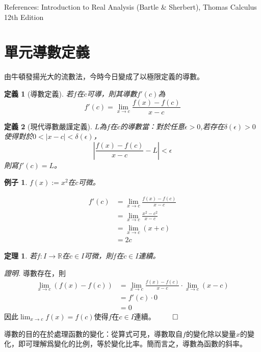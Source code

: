 \documentclass[12pt]{article}
\newtheorem{definition}{定義}
\newtheorem*{theorem}{定理}
\newtheorem*{example}{例子}
\renewenvironment*{proof}{\textit{證明.}}{\hfill$\qed$}
\begin{document}
    References: Introduction to Real Analysis (Bartle \& Sherbert), Thomas Calculus 12th Edition
    \section*{單元導數定義}

    由牛頓發揚光大的流數法，今時今日變成了以極限定義的導數。

    \begin{definition}[導數定義]
        若$f$在$c$可導，則其導數$f'(c)$為$$f'(c)=\lim_{x\to c}\frac{f(x)-f(c)}{x-c}$$
    \end{definition}

    \begin{definition}[現代導數嚴謹定義]
        $L$為$f$在$c$的導數當：對於任意$\epsilon>0$,若存在$\delta(\epsilon)>0$使得對於$0<|x-c|<\delta(\epsilon)$，$$|\frac{f(x)-f(c)}{x-c}-L|<\epsilon$$
        則寫$f'(c)=L$。
    \end{definition}

    \begin{example}
        $f(x):=x^2$在$c$可微。

        \begin{align*}
            f'(c)&=\lim_{x\to c}\frac{f(x)-f(c)}{x-c}\\
            &=\lim_{x\to c}\frac{x^2-c^2}{x-c}\\
            &=\lim_{x\to c}(x+c)\\
            &=2c
        \end{align*}
    \end{example}

    \begin{theorem}
        若$f:I\to\mathbb{R}$在$c\in I$可微，則$f$在$c\in I$連續。
    \end{theorem}

    \begin{proof}
        導數存在，則\begin{align*}
            \lim_{x\to c}(f(x)-f(c))&=\lim_{x\to c}\frac{f(x)-f(c)}{x-c}\cdot \lim_{x\to c}(x-c)\\
            &=f'(c)\cdot 0\\
            &=0
        \end{align*}
        因此$\displaystyle\lim_{x\to c}f(x)=f(c)$使得$f$在$c\in I$連續。
    \end{proof}

    導數的目的在於處理函數的變化：從算式可見，導數取自$f$的變化除以變量$x$的變化，即可理解爲變化的比例，等於變化比率。簡而言之，導數為函數的斜率。
\end{document}
